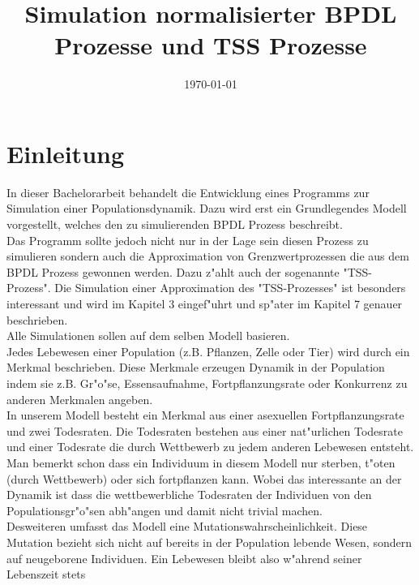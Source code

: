 \documentclass[11pt, a4paper, german]{article}
\date{\today}
\title{Simulation normalisierter BPDL Prozesse und TSS Prozesse}
\theoremstyle{plain}
\begin{document}
\maketitle
\setcounter{tocdepth}{2}
\tableofcontents


\clearpage
\section{Einleitung}
In dieser Bachelorarbeit behandelt die Entwicklung eines Programms zur Simulation einer Populationsdynamik. Dazu wird erst ein Grundlegendes Modell vorgestellt, welches den zu simulierenden BPDL Prozess beschreibt.\\
Das Programm sollte jedoch nicht nur in der Lage sein diesen Prozess zu simulieren sondern auch die Approximation von Grenzwertprozessen die aus dem BPDL Prozess gewonnen werden. Dazu z"ahlt auch der sogenannte "{}TSS-Prozess"{}. Die Simulation einer Approximation des "{}TSS-Prozesses"{} ist besonders interessant und wird im Kapitel 3 eingef"uhrt und sp"ater im Kapitel 7 genauer beschrieben.\\
Alle Simulationen sollen auf dem selben Modell basieren.\\
Jedes Lebewesen einer Population (z.B. Pflanzen, Zelle oder Tier) wird durch ein Merkmal beschrieben. Diese Merkmale erzeugen Dynamik in der Population indem sie z.B. Gr"o"se, Essensaufnahme, Fortpflanzungsrate oder Konkurrenz zu anderen Merkmalen angeben.\\
In unserem Modell besteht ein Merkmal aus einer asexuellen Fortpflanzungsrate und zwei Todesraten. Die Todesraten bestehen aus einer nat"urlichen Todesrate und einer Todesrate die durch Wettbewerb zu jedem anderen Lebewesen entsteht. Man bemerkt schon dass ein Individuum in diesem Modell nur sterben, t"oten (durch Wettbewerb) oder sich fortpflanzen kann. Wobei das interessante an der Dynamik ist dass die wettbewerbliche Todesraten der Individuen von den Populationsgr"o"sen abh"angen und damit nicht trivial machen.\\
Desweiteren umfasst das Modell eine Mutationswahrscheinlichkeit. Diese Mutation bezieht sich nicht auf bereits in der Population lebende Wesen, sondern auf neugeborene Individuen. Ein Lebewesen bleibt also w"ahrend seiner Lebenszeit stets
\end{document}
